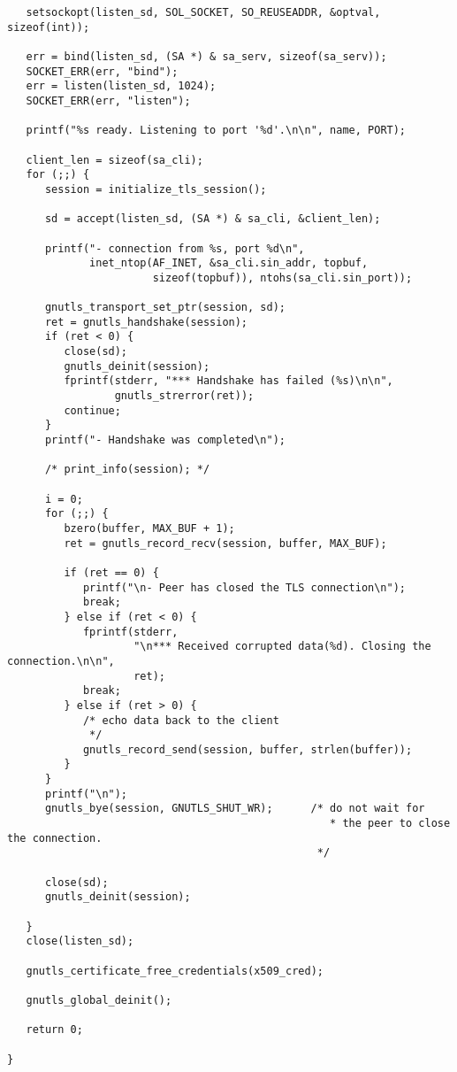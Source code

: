 \begin{verbatim}
   setsockopt(listen_sd, SOL_SOCKET, SO_REUSEADDR, &optval, sizeof(int));

   err = bind(listen_sd, (SA *) & sa_serv, sizeof(sa_serv));
   SOCKET_ERR(err, "bind");
   err = listen(listen_sd, 1024);
   SOCKET_ERR(err, "listen");

   printf("%s ready. Listening to port '%d'.\n\n", name, PORT);

   client_len = sizeof(sa_cli);
   for (;;) {
      session = initialize_tls_session();

      sd = accept(listen_sd, (SA *) & sa_cli, &client_len);

      printf("- connection from %s, port %d\n",
             inet_ntop(AF_INET, &sa_cli.sin_addr, topbuf,
                       sizeof(topbuf)), ntohs(sa_cli.sin_port));

      gnutls_transport_set_ptr(session, sd);
      ret = gnutls_handshake(session);
      if (ret < 0) {
         close(sd);
         gnutls_deinit(session);
         fprintf(stderr, "*** Handshake has failed (%s)\n\n",
                 gnutls_strerror(ret));
         continue;
      }
      printf("- Handshake was completed\n");

      /* print_info(session); */

      i = 0;
      for (;;) {
         bzero(buffer, MAX_BUF + 1);
         ret = gnutls_record_recv(session, buffer, MAX_BUF);

         if (ret == 0) {
            printf("\n- Peer has closed the TLS connection\n");
            break;
         } else if (ret < 0) {
            fprintf(stderr,
                    "\n*** Received corrupted data(%d). Closing the connection.\n\n",
                    ret);
            break;
         } else if (ret > 0) {
            /* echo data back to the client
             */
            gnutls_record_send(session, buffer, strlen(buffer));
         }
      }
      printf("\n");
      gnutls_bye(session, GNUTLS_SHUT_WR);      /* do not wait for
                                                   * the peer to close the connection.
                                                 */

      close(sd);
      gnutls_deinit(session);

   }
   close(listen_sd);

   gnutls_certificate_free_credentials(x509_cred);

   gnutls_global_deinit();

   return 0;

}



\end{verbatim}
